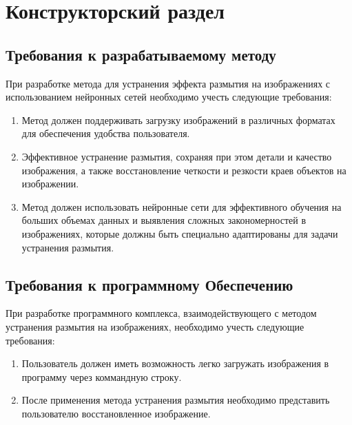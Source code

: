 \chapter{Конструкторский раздел}


\section{Требования к разрабатываемому методу}

При разработке метода для устранения эффекта размытия на изображениях с использованием нейронных сетей необходимо учесть следующие требования:

\begin{enumerate}[left=0.49cm]
    \item Метод должен поддерживать загрузку изображений в различных форматах для обеспечения удобства пользователя.

    \item Эффективное устранение размытия, сохраняя при этом детали и качество изображения, а также восстановление четкости и резкости краев объектов на изображении.


    \item Метод должен использовать нейронные сети для эффективного обучения на больших объемах данных и выявления сложных закономерностей в изображениях, которые должны быть специально адаптированы для задачи устранения размытия.
\end{enumerate}

\section{Требования к программному Обеспечению}

При разработке программного комплекса, взаимодействующего с методом устранения размытия на изображениях, необходимо учесть следующие требования:

\begin{enumerate}[left=0.49cm]
    \item Пользователь должен иметь возможность легко загружать изображения в программу через коммандную строку.

    \item После применения метода устранения размытия необходимо представить пользователю восстановленное изображение.
\end{enumerate}

